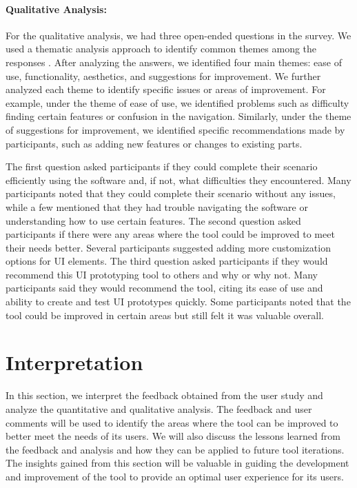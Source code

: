 \paragraph{Qualitative Analysis:}
For the qualitative analysis, we had three open-ended questions in the survey. 
We used a thematic analysis approach to identify common themes among the responses \cite{misc:qualitative:thematic}. 
After analyzing the answers, we identified four main themes: ease of use, functionality, aesthetics, and suggestions for improvement.
We further analyzed each theme to identify specific issues or areas of improvement. 
For example, under the theme of ease of use, we identified problems such as difficulty finding certain features or confusion in the navigation. 
Similarly, under the theme of suggestions for improvement, we identified specific recommendations made by participants, such as adding new features or changes to existing parts.

The first question asked participants if they could complete their scenario efficiently using the software and, if not, what difficulties they encountered. 
Many participants noted that they could complete their scenario without any issues, while a few mentioned that they had trouble navigating the software or understanding how to use certain features.
The second question asked participants if there were any areas where the tool could be improved to meet their needs better. 
Several participants suggested adding more customization options for UI elements.
The third question asked participants if they would recommend this UI prototyping tool to others and why or why not. 
Many participants said they would recommend the tool, citing its ease of use and ability to create and test UI prototypes quickly. 
Some participants noted that the tool could be improved in certain areas but still felt it was valuable overall.


\clearpage
\section{Interpretation}
\label{evaluation:section:interpretation}
In this section, we interpret the feedback obtained from the user study and analyze the quantitative and qualitative analysis. 
The feedback and user comments will be used to identify the areas where the tool can be improved to better meet the needs of its users. 
We will also discuss the lessons learned from the feedback and analysis and how they can be applied to future tool iterations. 
The insights gained from this section will be valuable in guiding the development and improvement of the tool to provide an optimal user experience for its users.


